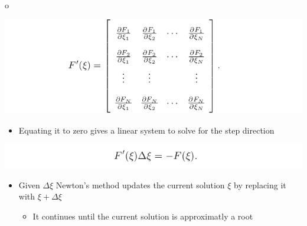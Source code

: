 \documentclass[11pt]{article}
\begin{document}
o\begin{center}
\includegraphics[width=.9\linewidth]{A Path-Following Method/screenshot_2019-03-11_16-34-22.png}
\end{center}
\begin{itemize}
\item Equating it to zero gives a linear system to solve for the step direction
\end{itemize}
\begin{center}
\includegraphics[width=.9\linewidth]{A Path-Following Method/screenshot_2019-03-11_16-36-21.png}
\end{center}

\begin{itemize}
\item Given \(\Delta \xi\) Newton's method updates the current solution \(\xi\) by replacing it with \(\xi + \Delta \xi\)
\begin{itemize}
\item It continues until the current solution is approximatly a root
\end{itemize}
\end{itemize}
\end{document}
